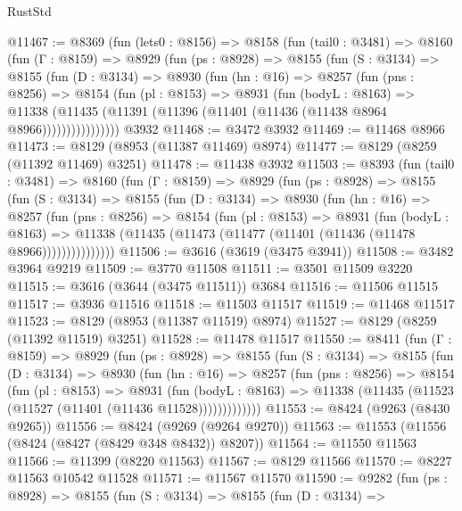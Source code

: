 \begin{lexlean}{RustStd}
\begin{coremodule}
@11467 := @8369
    (fun (lets0 : @8156) =>
    @8158
      (fun (tail0 : @3481) =>
      @8160
        (fun (Γ : @8159) =>
        @8929
          (fun (ps : @8928) =>
          @8155
            (fun (S : @3134) =>
            @8155
              (fun (D : @3134) =>
              @8930
                (fun (hn : @16) =>
                @8257
                  (fun (pns : @8256) =>
                  @8154
                    (fun (pl : @8153) =>
                    @8931
                      (fun (bodyL : @8163) =>
                      @11338
                        (@11435 (@11391 (@11396 (@11401 (@11436 (@11438 @8964 @8966))))))))))))))))
    @3932
@11468 := @3472 @3932
@11469 := @11468 @8966
@11473 := @8129 (@8953 (@11387 @11469) @8974)
@11477 := @8129 (@8259 (@11392 @11469) @3251)
@11478 := @11438 @3932
@11503 := @8393
    (fun (tail0 : @3481) =>
    @8160
      (fun (Γ : @8159) =>
      @8929
        (fun (ps : @8928) =>
        @8155
          (fun (S : @3134) =>
          @8155
            (fun (D : @3134) =>
            @8930
              (fun (hn : @16) =>
              @8257
                (fun (pns : @8256) =>
                @8154
                  (fun (pl : @8153) =>
                  @8931
                    (fun (bodyL : @8163) =>
                    @11338 (@11435 (@11473 (@11477 (@11401 (@11436 (@11478 @8966)))))))))))))))
@11506 := @3616 (@3619 (@3475 @3941))
@11508 := @3482 @3964 @9219
@11509 := @3770 @11508
@11511 := @3501 @11509 @3220
@11515 := @3616 (@3644 (@3475 @11511)) @3684
@11516 := @11506 @11515
@11517 := @3936 @11516
@11518 := @11503 @11517
@11519 := @11468 @11517
@11523 := @8129 (@8953 (@11387 @11519) @8974)
@11527 := @8129 (@8259 (@11392 @11519) @3251)
@11528 := @11478 @11517
@11550 := @8411
    (fun (Γ : @8159) =>
    @8929
      (fun (ps : @8928) =>
      @8155
        (fun (S : @3134) =>
        @8155
          (fun (D : @3134) =>
          @8930
            (fun (hn : @16) =>
            @8257
              (fun (pns : @8256) =>
              @8154
                (fun (pl : @8153) =>
                @8931
                  (fun (bodyL : @8163) =>
                  @11338 (@11435 (@11523 (@11527 (@11401 (@11436 @11528)))))))))))))
@11553 := @8424 (@9263 (@8430 @9265))
@11556 := @8424 (@9269 (@9264 @9270))
@11563 := @11553 (@11556 (@8424 (@8427 (@8429 @348 @8432)) @8207))
@11564 := @11550 @11563
@11566 := @11399 (@8220 @11563)
@11567 := @8129 @11566
@11570 := @8227 @11563 @10542 @11528
@11571 := @11567 @11570
@11590 := @9282
    (fun (ps : @8928) =>
    @8155
      (fun (S : @3134) =>
      @8155
        (fun (D : @3134) =>

\end{coremodule}
\end{lexlean}
